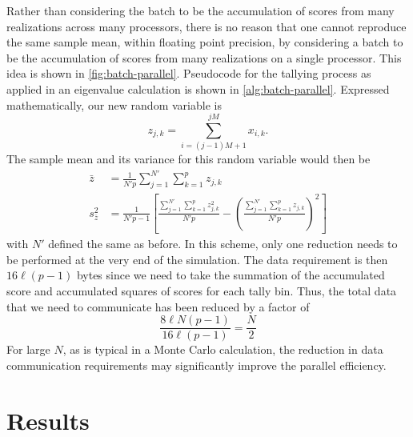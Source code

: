 Rather than considering the batch to be the accumulation of scores from many
realizations across many processors, there is no reason that one cannot
reproduce the same sample mean, within floating point precision, by considering
a batch to be the accumulation of scores from many realizations on a single
processor. This idea is shown in \autoref{fig:batch-parallel}. Pseudocode for
the tallying process as applied in an eigenvalue calculation is shown in
\autoref{alg:batch-parallel}. Expressed mathematically, our new random variable
is
\begin{equation}
  z_{j,k} = \sum_{i=(j-1)M + 1}^{jM} x_{i,k}.
\end{equation}
The sample mean and its variance for this random variable would then be
\begin{align}
  \bar{z} &= \frac{1}{N'p} \sum_{j=1}^{N'} \sum_{k=1}^p z_{j,k} \\ s^2_{\bar{z}}
  &= \frac{1}{N'p-1} \left [ \frac{\sum_{j=1}^{N'} \sum_{k=1}^p z_{j,k}^2}{N'p}
    - \left ( \frac{\sum_{j=1}^{N'} \sum_{k=1}^p z_{j,k}}{N'p} \right )^2 \right
  ]
\end{align}
with $N'$ defined the same as before. In this scheme, only one reduction needs
to be performed at the very end of the simulation. The data requirement is then
$16\ell(p-1)$ bytes since we need to take the summation of the accumulated score
and accumulated squares of scores for each tally bin. Thus, the total data that
we need to communicate has been reduced by a factor of
\begin{equation}
  \frac{8\ell N(p-1)}{16\ell (p-1)} = \frac{N}{2}
\end{equation}
For large $N$, as is typical in a Monte Carlo calculation, the reduction in data
communication requirements may significantly improve the parallel efficiency.
  
\section{Results}
\label{sec:tally-reduction-results}

